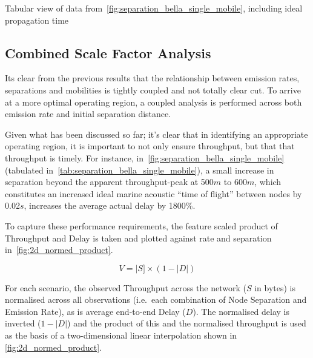 \begin{table}[h]
	\caption{Tabular view of data from~\autoref{fig:separation_bella_single_mobile}, including ideal propagation time} \label{tab:separation_bella_single_mobile}
	\begin{center}
    
	\end{center}
\end{table}


\clearpage

\subsection{Combined Scale Factor Analysis}

Its clear from the previous results that the relationship between emission rates, separations and mobilities is tightly coupled and not totally clear cut. 
To arrive at a more optimal operating region, a coupled analysis is performed across both emission rate and initial separation distance.

Given what has been discussed so far; it's clear that in identifying an appropriate operating region, it is important to not only ensure throughput, but that that throughput is timely.
For instance, in~\autoref{fig:separation_bella_single_mobile} (tabulated in~\autoref{tab:separation_bella_single_mobile}), a small increase in separation beyond the apparent throughput-peak at 500$m$ to 600$m$, which constitutes an increased ideal marine acoustic ``time of flight'' between nodes by 0.02$s$, increases the average actual delay by 1800\%. 

To capture these performance requirements, the feature scaled product of Throughput and Delay is taken and plotted against rate and separation in~\autoref{fig:2d_normed_product}.

\begin{equation}
  V = |S] \times (1 - |D|)
  \label{eq:normed_product}
\end{equation}

For each scenario, the observed Throughput across the network ($S$ in bytes) is normalised across all observations (i.e.\ each combination of Node Separation and Emission Rate), as is average end-to-end Delay ($D$). The normalised delay is inverted ($1-|D|$) and the product of this and the normalised throughput is used as the basis of a two-dimensional linear interpolation shown in \autoref{fig:2d_normed_product}.



